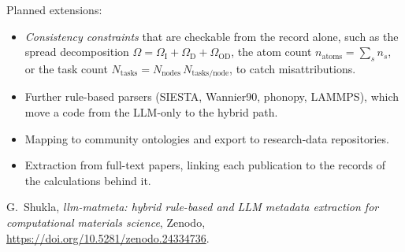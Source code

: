 \documentclass[11pt,a4paper]{article}
\begin{document}
Planned extensions:
\begin{itemize}
\item \emph{Consistency constraints} that are checkable from the record alone, such as
      the spread decomposition \(\Omega=\Omega_{\mathrm I}+\Omega_{\mathrm D}+\Omega_{\mathrm{OD}}\), the atom count
      \(n_{\mathrm{atoms}}=\sum_s n_s\), or the task count \(N_{\mathrm{tasks}}=N_{\mathrm{nodes}}\,N_{\mathrm{tasks/node}}\),
      to catch misattributions.
\item Further rule-based parsers (SIESTA, Wannier90, phonopy, LAMMPS), which move a code from the LLM-only to the hybrid path.
\item Mapping to community ontologies and export to research-data repositories.
\item Extraction from full-text papers, linking each publication to the records of the calculations behind it.
\end{itemize}

\vspace{6mm}
\begin{keybox}\small
{} G.~Shukla, \emph{llm-matmeta: hybrid rule-based and LLM metadata extraction for
computational materials science}, Zenodo, \url{https://doi.org/10.5281/zenodo.24334736}.
\end{keybox}
\end{document}
